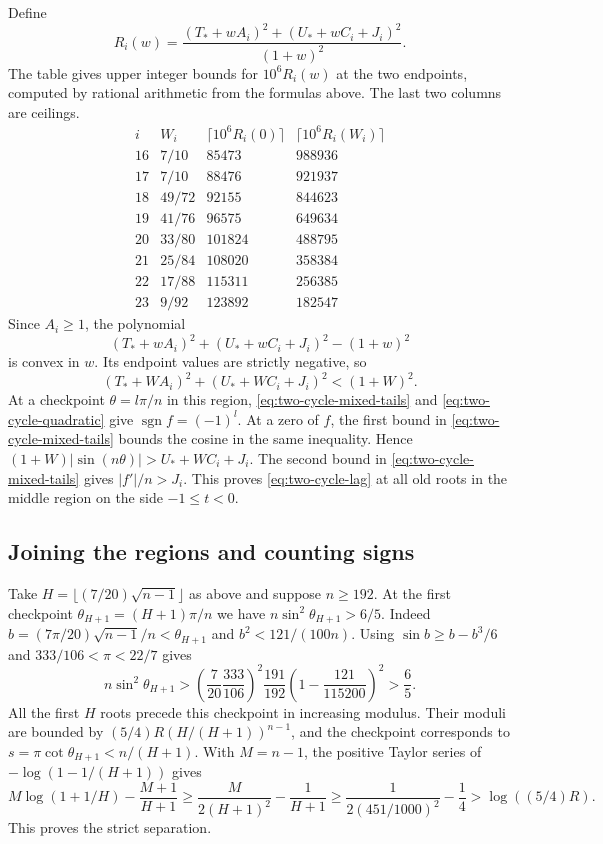 Define
\[
 R_i(w)=\frac{(T_*+wA_i)^2+(U_*+wC_i+J_i)^2}{(1+w)^2}.
\]
The table gives upper integer bounds for $10^6R_i(w)$ at the two
endpoints, computed by rational arithmetic from the formulas above.
The last two columns are ceilings.
\[
\begin{array}{c|c|r|r}
 i & W_i & \lceil 10^6R_i(0)\rceil & \lceil 10^6R_i(W_i)\rceil\\ \hline
 16 & 7/10  & 85473  & 988936\\
 17 & 7/10  & 88476  & 921937\\
 18 & 49/72 & 92155  & 844623\\
 19 & 41/76 & 96575  & 649634\\
 20 & 33/80 & 101824 & 488795\\
 21 & 25/84 & 108020 & 358384\\
 22 & 17/88 & 115311 & 256385\\
 23 & 9/92  & 123892 & 182547
\end{array}
\]
Since $A_i\ge1$, the polynomial
\[
 (T_*+wA_i)^2+(U_*+wC_i+J_i)^2-(1+w)^2
\]
is convex in $w$. Its endpoint values are strictly negative, so
\begin{equation}
 (T_*+WA_i)^2+(U_*+WC_i+J_i)^2<(1+W)^2.
 \label{eq:two-cycle-quadratic}
\end{equation}
At a checkpoint $\theta=l\pi/n$ in this region,
\eqref{eq:two-cycle-mixed-tails} and \eqref{eq:two-cycle-quadratic}
give $\operatorname{sgn} f=(-1)^l$.
At a zero of $f$, the first bound in \eqref{eq:two-cycle-mixed-tails}
bounds the cosine in the same inequality. Hence
$(1+W)|\sin(n\theta)|>U_*+WC_i+J_i$. The second bound in
\eqref{eq:two-cycle-mixed-tails} gives $|f'|/n>J_i$.
This proves \eqref{eq:two-cycle-lag} at all old roots in the
middle region on the side $-1\le t<0$.

\subsection{Joining the regions and counting signs}

Take $H=\lfloor(7/20)\sqrt{n-1}\rfloor$ as above and suppose $n\ge192$.
At the first checkpoint $\theta_{H+1}=(H+1)\pi/n$ we have
$n\sin^2\theta_{H+1}>6/5$. Indeed
$b=(7\pi/20)\sqrt{n-1}/n<\theta_{H+1}$ and
$b^2<121/(100n)$. Using $\sin b\ge b-b^3/6$ and
$333/106<\pi<22/7$ gives
\[
 n\sin^2\theta_{H+1}>
 \left(\frac7{20}\frac{333}{106}\right)^2
 \frac{191}{192}\left(1-\frac{121}{115200}\right)^2>\frac65.
\]
All the first $H$ roots precede this checkpoint in increasing modulus.
Their moduli are bounded by $(5/4)R(H/(H+1))^{n-1}$, and the
checkpoint corresponds to $s=\pi\cot\theta_{H+1}<n/(H+1)$.
With $M=n-1$, the positive Taylor series of
$-\log(1-1/(H+1))$ gives
\[
 M\log(1+1/H)-\frac{M+1}{H+1}
 \ge\frac{M}{2(H+1)^2}-\frac1{H+1}
 \ge\frac{1}{2(451/1000)^2}-\frac14
 >\log((5/4)R).
\]
This proves the strict separation.

